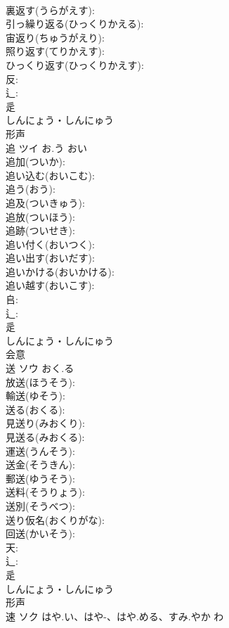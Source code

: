 \documentclass[8pt]{extreport}
\begin{document}
\begin{CJK}{UTF8}{min}
\\	裏返す(うらがえす): 
\\	引っ繰り返る(ひっくりかえる): 
\\	宙返り(ちゅうがえり): 
\\	照り返す(てりかえす): 
\\	ひっくり返す(ひっくりかえす): 
\\	反: 
\\	辶: 
\\	辵	
\\	しんにょう・しんにゅう	
\\	形声 
\\	追	ツイ	お.う	おい	
\\	追加(ついか): 
\\	追い込む(おいこむ): 
\\	追う(おう): 
\\	追及(ついきゅう): 
\\	追放(ついほう): 
\\	追跡(ついせき): 
\\	追い付く(おいつく): 
\\	追い出す(おいだす): 
\\	追いかける(おいかける): 
\\	追い越す(おいこす): 
\\	𠂤: 
\\	辶: 
\\	辵	
\\	しんにょう・しんにゅう	
\\	会意 
\\	送	ソウ	おく.る		
\\	放送(ほうそう): 
\\	輸送(ゆそう): 
\\	送る(おくる): 
\\	見送り(みおくり): 
\\	見送る(みおくる): 
\\	運送(うんそう): 
\\	送金(そうきん): 
\\	郵送(ゆうそう): 
\\	送料(そうりょう): 
\\	送別(そうべつ): 
\\	送り仮名(おくりがな): 
\\	回送(かいそう): 
\\	天: 
\\	辶: 
\\	辵	
\\	しんにょう・しんにゅう	
\\	形声 
\\	速	ソク	はや.い、はや-、はや.める、すみ.やか	わ	

\end{CJK}
\end{document}
